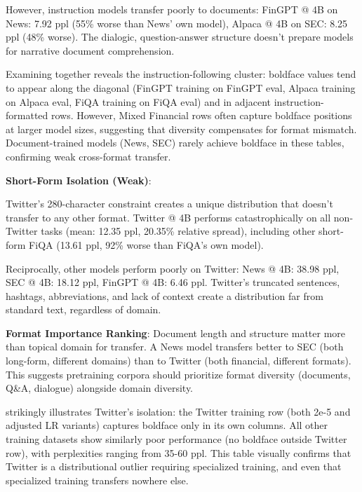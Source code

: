 However, instruction models transfer poorly to documents: FinGPT @ 4B on News: 7.92 ppl (55\% worse than News' own model), Alpaca @ 4B on SEC: 8.25 ppl (48\% worse). The dialogic, question-answer structure doesn't prepare models for narrative document comprehension.







Examining  together reveals the instruction-following cluster: boldface values tend to appear along the diagonal (FinGPT training on FinGPT eval, Alpaca training on Alpaca eval, FiQA training on FiQA eval) and in adjacent instruction-formatted rows. However, Mixed Financial rows often capture boldface positions at larger model sizes, suggesting that diversity compensates for format mismatch. Document-trained models (News, SEC) rarely achieve boldface in these tables, confirming weak cross-format transfer.

\textbf{Short-Form Isolation (Weak)}:

Twitter's 280-character constraint creates a unique distribution that doesn't transfer to any other format. Twitter @ 4B performs catastrophically on all non-Twitter tasks (mean: 12.35 ppl, 20.35\% relative spread), including other short-form FiQA (13.61 ppl, 92\% worse than FiQA's own model).

Reciprocally, other models perform poorly on Twitter: News @ 4B: 38.98 ppl, SEC @ 4B: 18.12 ppl, FinGPT @ 4B: 6.46 ppl. Twitter's truncated sentences, hashtags, abbreviations, and lack of context create a distribution far from standard text, regardless of domain.

\textbf{Format Importance Ranking}: Document length and structure matter more than topical domain for transfer. A News model transfers better to SEC (both long-form, different domains) than to Twitter (both financial, different formats). This suggests pretraining corpora should prioritize format diversity (documents, Q\&A, dialogue) alongside domain diversity.



 strikingly illustrates Twitter's isolation: the Twitter training row (both 2e-5 and adjusted LR variants) captures boldface only in its own columns. All other training datasets show similarly poor performance (no boldface outside Twitter row), with perplexities ranging from 35-60 ppl. This table visually confirms that Twitter is a distributional outlier requiring specialized training, and even that specialized training transfers nowhere else.

